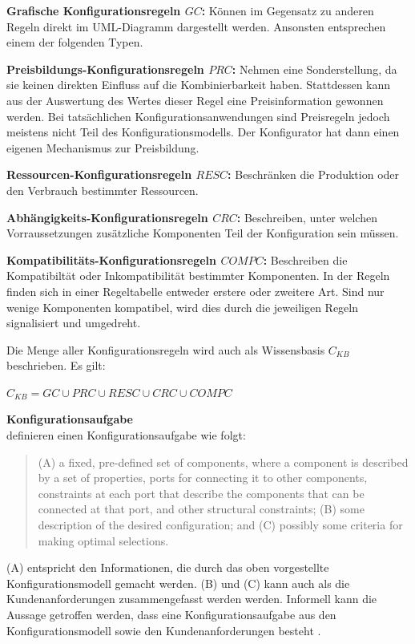 \documentclass[12pt,a4paper,bibliography=totocnumbered,listof=totoc]{scrartcl}
\begin{document}
\begin{compactitem}
\item \textbf{Grafische Konfigurationsregeln $GC$:} Können im Gegensatz zu anderen Regeln direkt im UML-Diagramm dargestellt werden. Ansonsten entsprechen einem der folgenden Typen.
\item \textbf{Preisbildungs-Konfigurationsregeln $PRC$:} Nehmen eine Sonderstellung, da sie keinen direkten Einfluss auf die Kombinierbarkeit haben. Stattdessen kann aus der Auswertung des Wertes dieser Regel eine Preisinformation gewonnen werden. Bei tatsächlichen Konfigurationsanwendungen sind Preisregeln jedoch meistens nicht Teil des Konfigurationsmodells. Der Konfigurator hat dann einen eigenen Mechanismus zur Preisbildung.
\item \textbf{Ressourcen-Konfigurationsregeln $RESC$:} Beschränken die Produktion oder den Verbrauch bestimmter Ressourcen.
\item \textbf{Abhängigkeits-Konfigurationsregeln $CRC$:} Beschreiben, unter welchen Vorraussetzungen zusätzliche Komponenten Teil der Konfiguration sein müssen.
\item \textbf{Kompatibilitäts-Konfigurationsregeln $COMPC$:} Beschreiben die Kompatibiltät  oder Inkompatibilität bestimmter Komponenten. In der Regeln finden sich in einer Regeltabelle entweder erstere oder zweitere Art. Sind nur wenige Komponenten kompatibel, wird dies durch die jeweiligen Regeln signalisiert und umgedreht.
\end{compactitem}

Die Menge aller Konfigurationsregeln wird auch als Wissensbasis $C_{KB}$ beschrieben. Es gilt:

 $C_{KB} = GC \cup PRC \cup RESC \cup CRC \cup COMPC$

\textbf{Konfigurationsaufgabe}\\
\citet{mittal89} definieren einen Konfigurationsaufgabe wie folgt:
\begin{quote}
(A) a fixed, pre-defined set of components, where a component is described by a set of properties, ports for connecting it to other components, constraints at each port that describe the components that can be connected at that port, and other structural constraints; (B) some description of the desired configuration; and (C) possibly some criteria for making optimal selections.
\end{quote}
(A) entspricht den Informationen, die durch das oben vorgestellte Konfigurationsmodell gemacht werden. (B) und (C) kann auch als die Kundenanforderungen zusammengefasst werden werden. Informell kann die Aussage getroffen werden, dass eine Konfigurationsaufgabe aus den Konfigurationsmodell sowie den Kundenanforderungen besteht \citep{felferning14}.
\end{document}
